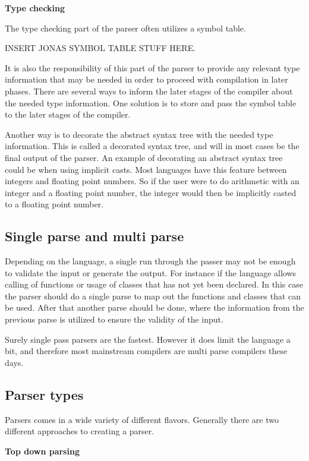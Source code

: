 \textbf{Type checking}

The type checking part of the parser often utilizes a symbol table.

INSERT JONAS SYMBOL TABLE STUFF HERE.

It is also the responsibility of this part of the parser to provide any relevant type information that may be needed in order to proceed with compilation in later phases. 
There are several ways to inform the later stages of the compiler about the needed type information. 
One solution is to store and pass the symbol table to the later stages of the compiler. 

Another way is to decorate the abstract syntax tree with the needed type information. 
This is called a decorated syntax tree, and will in most cases be the final output of the parser.
An example of decorating an abstract syntax tree could be when using implicit casts. 
Most languages have this feature between integers and floating point numbers. 
So if the user were to do arithmetic with an integer and a floating point number, the integer would then be implicitly casted to a floating point number.

\subsection{Single parse and multi parse}

Depending on the language, a single run through the passer may not be enough to validate the input or generate the output. 
For instance if the language allows calling of functions or usage of classes that has not yet been declared. 
In this case the parser should do a single parse to map out the functions and classes that can be used. 
After that another parse should be done, where the information from the previous parse is utilized to ensure the validity of the input. 

Surely single pass parsers are the fastest. 
However it does limit the language a bit, and therefore most mainstream compilers are multi parse compilers these days.

\subsection{Parser types}

Parsers comes in a wide variety of different flavors. 
Generally there are two different approaches to creating a parser.

\textbf{Top down parsing}

